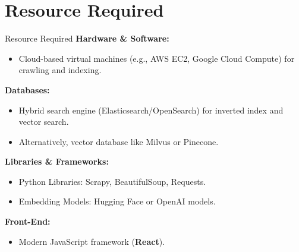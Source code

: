 \section{Resource Required}

    \begin{frame}{Resource Required}
        \small
        \textbf{Hardware & Software:}
        \begin{itemize}
            \item Cloud-based virtual machines (e.g., AWS EC2, Google Cloud Compute) for crawling and indexing.
        \end{itemize}
        
        \textbf{Databases:}
        \begin{itemize}
            \item Hybrid search engine (Elasticsearch/OpenSearch) for inverted index and vector search.
            \item Alternatively, vector database like Milvus or Pinecone.
        \end{itemize}
        
        \textbf{Libraries \& Frameworks:}
        \begin{itemize}
            \item Python Libraries: Scrapy, BeautifulSoup, Requests.
            \item Embedding Models: Hugging Face or OpenAI models.
        \end{itemize}
        
        \textbf{Front-End:}
        \begin{itemize}
            \item Modern JavaScript framework (\textbf{React}).
        \end{itemize}
    
    \end{frame}
